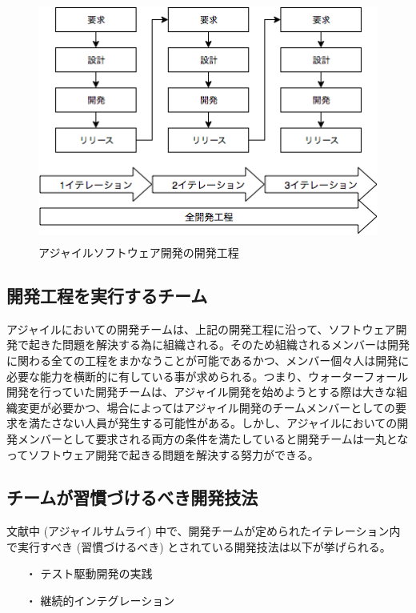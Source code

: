 \begin{figure}[H]
\centering
\includegraphics[height=8cm]{./assets/images/agile.png}
\caption{アジャイルソフトウェア開発の開発工程}
\label{fig:agile}
\end{figure}


\subsection{開発工程を実行するチーム}


アジャイルにおいての開発チームは、上記の開発工程に沿って、ソフトウェア開発で起きた問題を解決する為に組織される。そのため組織されるメンバーは開発に関わる全ての工程をまかなうことが可能であるかつ、メンバー個々人は開発に必要な能力を横断的に有している事が求められる。つまり、ウォーターフォール開発を行っていた開発チームは、アジャイル開発を始めようとする際は大きな組織変更が必要かつ、場合によってはアジャイル開発のチームメンバーとしての要求を満たさない人員が発生する可能性がある。しかし、アジャイルにおいての開発メンバーとして要求される両方の条件を満たしていると開発チームは一丸となってソフトウェア開発で起きる問題を解決する努力ができる。

\subsection{チームが習慣づけるべき開発技法}


文献中 (アジャイルサムライ) 中で、開発チームが定められたイテレーション内で実行すべき (習慣づけるべき) とされている開発技法は以下が挙げられる。

\begin{itemize}
 \item[・]テスト駆動開発の実践
 \item[・]継続的インテグレーション
\end{itemize}

